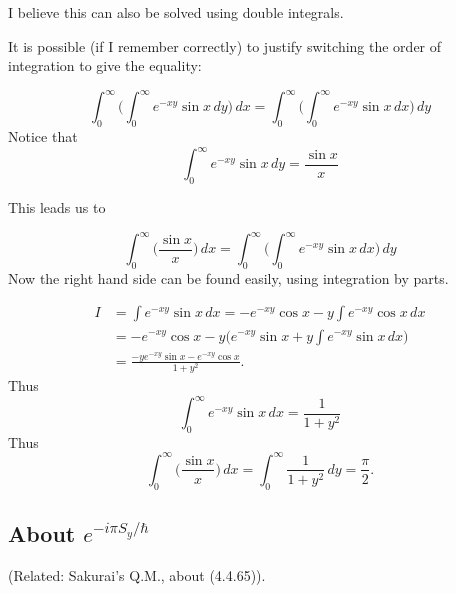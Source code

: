 \documentclass{article}
\numberwithin{equation}{subsection} %
\theoremstyle{definition}
\begin{document}
I believe this can also be solved using double integrals.

It is possible (if I remember correctly) to justify switching the order of integration to give the equality:

$$\int_{0}^{\infty} \Bigg(\int_{0}^{\infty} e^{-xy} \sin x \,dy \Bigg)\, dx = \int_{0}^{\infty} \Bigg(\int_{0}^{\infty} e^{-xy} \sin x \,dx \Bigg)\,dy$$
Notice that
$$\int_{0}^{\infty} e^{-xy} \sin x\,dy = \frac{\sin x}{x}$$

This leads us to

$$\int_{0}^{\infty} \Big(\frac{\sin x}{x} \Big) \,dx = \int_{0}^{\infty} \Bigg(\int_{0}^{\infty} e^{-xy} \sin x \,dx \Bigg)\,dy$$
Now the right hand side can be found easily, using integration by parts.

\begin{align*}
I &= \int e^{-xy} \sin x \,dx = -e^{-xy}{\cos x} - y \int e^{-xy} \cos x \, dx\\
&= -e^{-xy}{\cos x} - y \Big(e^{-xy}\sin x + y \int e^{-xy} \sin x \,dx \Big)\\
&= \frac{-ye^{-xy}\sin x - e^{-xy}\cos x}{1+y^2}.
\end{align*}
Thus $$\int_{0}^{\infty} e^{-xy} \sin x \,dx = \frac{1}{1+y^2}$$
Thus $$\int_{0}^{\infty} \Big(\frac{\sin x}{x} \Big) \,dx = \int_{0}^{\infty}\frac{1}{1+y^2}\,dy = \frac{\pi}{2}.$$


\subsection{About \texorpdfstring{$e^{-i\pi S_y/\hbar}$}{}}
\label{sec:About-exp(-i*pi S_y/hbar)}

    (Related: Sakurai's Q.M., about (4.4.65)).
\end{document}
